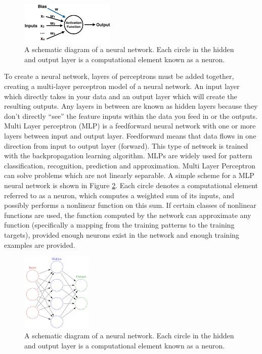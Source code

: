\documentclass[12pt]{article}
\numberwithin{equation}{section}
\numberwithin{table}{section}
\numberwithin{figure}{section}
\begin{document}
\begin{figure}[H] \centering
	\includegraphics[width=0.4\textwidth]{perceptron.png}
	\caption{A schematic diagram of a neural network. Each circle in the hidden and output layer is a computational element known as a neuron. }
	\label{perceptron}
\end{figure}

\noindent
To create a neural network, layers of perceptrons must be added together, creating a multi-layer perceptron model of a neural network. An input layer which directly takes in your data and an output layer which will create the resulting outputs. Any layers in between are known as hidden layers because they don’t directly “see” the feature inputs within the data you feed in or the outputs.  Multi Layer perceptron (MLP) is a feedforward neural network with one or more layers between input and output layer. Feedforward means that data flows in one direction from input to output layer (forward). This type of network is trained with the backpropagation learning algorithm. MLPs are widely used for pattern classification, recognition, prediction and approximation. Multi Layer Perceptron can solve problems which are not linearly separable. A simple scheme for a MLP neural network is shown in Figure \ref{figure5}. Each circle denotes a computational element referred to as a neuron, which computes a weighted sum of its inputs, and possibly performs a nonlinear function on this sum. If certain classes of nonlinear functions are used, the function computed by the network can approximate any function (specifically a mapping from the training patterns to the training targets), provided enough neurons exist in the network and enough training examples are provided.

\begin{figure}[H] \centering
	\includegraphics[width=0.3\textwidth]{mlp.png}
	\caption{A schematic diagram of a neural network. Each circle in the hidden and output layer is a computational element known as a neuron. }
	\label{figure5}
\end{figure}
\end{document}
